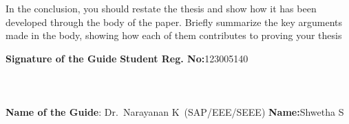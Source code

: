 	In the conclusion, you should restate the thesis and show how it has been developed through the body of the paper. Briefly summarize the key arguments made in the body, showing how each of them contributes to proving your thesis
	
	\vspace*{24pt}
	
		\noindent \textbf{Signature of the Guide} \hspace*{70mm} \textbf{Student Reg. No:}123005140\\
			\\
		\\
		\\
	\noindent \textbf{Name of the Guide}:{ Dr.~Narayanan K}~(SAP/EEE/SEEE) \hspace*{15mm} \textbf{Name:}Shwetha S
	\pagebreak
	\pagebreak
	
	
